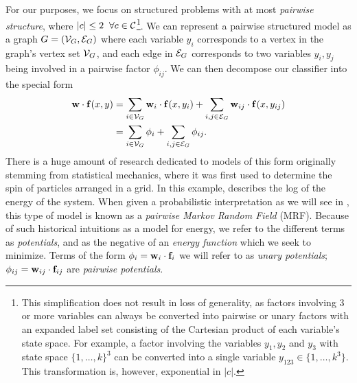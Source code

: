 For our purposes, we focus on structured problems with at most {\em pairwise 
structure}, where $|c| \leq 2\;\; \forall c \in \mathcal{C}$\footnote{This 
simplification does not result in loss of generality, as factors involving 3 or 
more variables can always be converted into pairwise or unary factors with an 
expanded label set consisting of the Cartesian product of each variable's state 
space. For example, a factor involving the variables $y_1,y_2$ and $y_3$ with 
state space $\{1,\ldots,k\}^3$ can be converted into a single variable $y_{123} 
\in \{1,\ldots,k^3\}$.  This transformation is, however, exponential in 
$|c|$.}.  We can represent a pairwise structured model as a graph $G = 
(\mathcal{V}_G,\mathcal{E}_G)$ where each variable $y_i$ corresponds to a vertex in the graph's 
vertex set $\mathcal{V}_G$, and each edge in $\mathcal{E}_G$ corresponds to two variables 
$y_i,y_j$ being involved in a pairwise factor $\phi_{ij}$.  We can then 
decompose our classifier into the special form
\begin{align}
\mathbf{w} \cdot \mathbf{f}(x,y) &= \sum_{i \in \mathcal{V}_G} \mathbf{w}_i \cdot \mathbf{f}(x,y_i) + \sum_{i,j \in 
\mathcal{E}_G} \mathbf{w}_{ij} \cdot \mathbf{f}(x,y_{ij}) \\
& = \sum_{i \in \mathcal{V}_G} \phi_i + \sum_{i,j \in \mathcal{E}_G} \phi_{ij}.
\label{eq:mrf}
\end{align} There is a huge amount of research dedicated to models of this form 
originally stemming from statistical mechanics, where it was first used to 
determine the spin of particles arranged in a grid. In this example, 
 describes the log of the energy of the system.  When given a 
probabilistic interpretation as we will see in , this type 
of model is known as a {\em pairwise Markov Random Field} (MRF).  Because of 
such historical intuitions as a model for energy, we refer to the different 
terms as {\em potentials}, and  as the negative of an {\em energy 
function} which we seek to minimize.  Terms of the form $\phi_i = \mathbf{w}_i \cdot 
\mathbf{f}_i$ we will refer to as {\em unary potentials}; $\phi_{ij} = \mathbf{w}_{ij} \cdot 
\mathbf{f}_{ij}$ are {\em pairwise potentials}.

